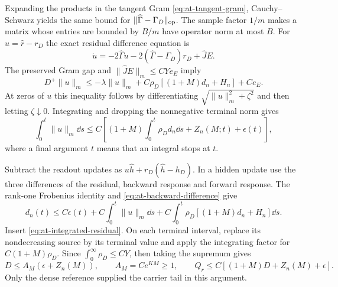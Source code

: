 Expanding the products in the tangent Gram
\eqref{eq:at-tangent-gram}, Cauchy--Schwarz yields the same bound for
$\|\widehat\Gamma-\Gamma_D\|_{\rm op}$.  The sample factor $1/m$
makes a matrix whose entries are bounded by $B/m$ have operator norm at
most $B$.  For $u=\widehat r-r_D$ the exact residual difference equation is
\[
 \dot u=-2\widehat\Gamma u
        -2(\widehat\Gamma-\Gamma_D)r_D+\widehat J E.
\]
The preserved Gram gap and $\|\widehat J E\|_m\le CY e_E$ imply
\[
 D^+\|u\|_m\le-\lambda\|u\|_m
       +C\rho_D[(1+M)d_n+H_n]+Ce_E.
\]
At zeros of $u$ this inequality follows by differentiating
$\sqrt{\|u\|_m^2+\zeta^2}$ and then letting $\zeta\downarrow0$.
Integrating and dropping the nonnegative terminal norm gives
\begin{equation}
 \int_0^t\|u\|_m\dd s
 \le C\left[(1+M)\int_0^t\rho_Dd_n\dd s
                  +Z_n(M;t)+\epsilon(t)\right],
 \label{eq:at-integrated-residual}
\end{equation}
where a final argument $t$ means that an integral stops at $t$.

Subtract the readout updates as
$u\widehat h+r_D(\widehat h-h_D)$.  In a hidden update use the three
differences of the residual, backward response and forward response.
The rank-one Frobenius identity and \eqref{eq:at-backward-difference} give
\[
 d_n(t)\le C\epsilon(t)+C\int_0^t\|u\|_m\dd s
                 +C\int_0^t\rho_D[(1+M)d_n+H_n]\dd s.
\]
Insert \eqref{eq:at-integrated-residual}.  On each terminal interval,
replace its nondecreasing source by its terminal value and apply the
integrating factor for $C(1+M)\rho_D$.  Since $\int_0^\infty\rho_D\le CY$,
then taking the supremum gives
\begin{equation}
 D\le A_M(\epsilon+Z_n(M)),\qquad A_M=Ce^{KM}\ge1,
 \qquad Q_r\le C[(1+M)D+Z_n(M)+\epsilon].
 \label{eq:at-damping}
\end{equation}
Only the dense reference supplied the carrier tail in this argument.

